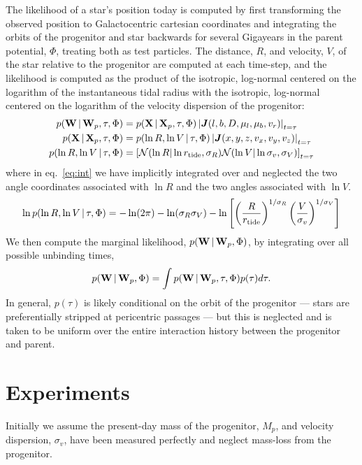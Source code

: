 \documentclass[letterpaper,12pt,preprint]{aastex}
\newcommand{\given}{\,|\,}
\newcommand{\jac}[1]{\left\vert \J{#1} \right\vert}
\newcommand{\D}{{\bf D}}
\newcommand{\W}{{\bf W}}
\newcommand{\X}{{\bf X}}
\newcommand{\J}{{\boldsymbol J}}
\newcommand{\rtide}{r_{\rm tide}}
\begin{document}
The likelihood of a star's position today is computed by first transforming the observed position to Galactocentric cartesian coordinates and integrating the orbits of the progenitor and star backwards for several Gigayears in the parent potential, $\Phi$, treating both as test particles. The distance, $R$, and velocity, $V$, of the star relative to the progenitor are computed at each time-step, and the likelihood is computed as the product of the isotropic, log-normal centered on the logarithm of the instantaneous tidal radius with the isotropic, log-normal centered on the logarithm of the velocity dispersion of the progenitor:
\begin{align}
	p(\W \given \W_p, \tau, \Phi) &= p(\X \given \X_p, \tau, \Phi) \jac{(l,b,D,\mu_l,\mu_b,v_r)}_{t=\tau}\\
	p(\X \given \X_p, \tau, \Phi) &= p(\ln R, \ln V \given \tau, \Phi) \jac{(x,y,z,v_x,v_y,v_z)}_{t=\tau}\label{eq:int} \\
	p(\ln R, \ln V \given \tau, \Phi) &= \left[\mathcal{N}(\ln R | \ln \rtide, \sigma_R)\mathcal{N}(\ln V | \ln \sigma_v, \sigma_V)\right]_{t=\tau}
\end{align}
where in eq.~\ref{eq:int} we have implicitly integrated over and neglected the two angle coordinates associated with $\ln R$ and the two angles associated with $\ln V$. 
\begin{align}
	\ln p(\ln R, \ln V \given \tau, \Phi) = -\ln(2\pi)-\ln(\sigma_R\sigma_V)-
		\ln\left[\left(\frac{R}{\rtide}\right)^{1/\sigma_R} \left(\frac{V}{\sigma_v}\right)^{1/\sigma_V}\right]
\end{align}
We then compute the marginal likelihood, $p(\W \given \W_p, \Phi)$, by integrating over all possible unbinding times,
\begin{align}
	p(\W \given \W_p, \Phi) = \int p(\W \given \W_p, \tau, \Phi)p(\tau) d\tau.
\end{align}
In general, $p(\tau)$ is likely conditional on the orbit of the progenitor --- stars are preferentially stripped at pericentric passages --- but this is neglected and is taken to be uniform over the entire interaction history between the progenitor and parent. 

\section{Experiments}
Initially we assume the present-day mass of the progenitor, $M_p$, and velocity dispersion, $\sigma_v$, have been measured perfectly and neglect mass-loss from the progenitor. 
\end{document}
